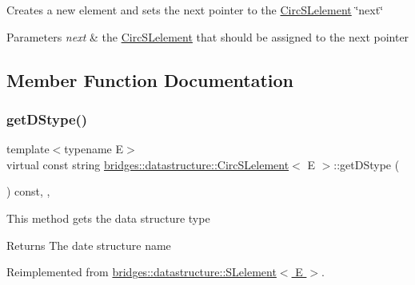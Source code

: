 Creates a new element and sets the next pointer to the \hyperlink{classbridges_1_1datastructure_1_1_circ_s_lelement}{Circ\+S\+Lelement} \char`\"{}next\char`\"{} 
\begin{DoxyParams}{Parameters}
{\em next} & the \hyperlink{classbridges_1_1datastructure_1_1_circ_s_lelement}{Circ\+S\+Lelement} that should be assigned to the next pointer \\
\hline
\end{DoxyParams}


\subsection{Member Function Documentation}
\mbox{\label{classbridges_1_1datastructure_1_1_circ_s_lelement_a775ba08a7811fe91c396cb27ba9343ab}} 
\subsubsection{\texorpdfstring{get\+D\+Stype()}{getDStype()}}
{\footnotesize\ttfamily template$<$typename E$>$ \\
virtual const string \hyperlink{classbridges_1_1datastructure_1_1_circ_s_lelement}{bridges\+::datastructure\+::\+Circ\+S\+Lelement}$<$ E $>$\+::get\+D\+Stype (\begin{DoxyParamCaption}{ }\end{DoxyParamCaption}) const\hspace{0.3cm}{\ttfamily [inline]}, {\ttfamily [override]}, {\ttfamily [virtual]}}

This method gets the data structure type

\begin{DoxyReturn}{Returns}
The date structure name 
\end{DoxyReturn}


Reimplemented from \hyperlink{classbridges_1_1datastructure_1_1_s_lelement_a602156aacacd73d1faa365d68d8af31b}{bridges\+::datastructure\+::\+S\+Lelement$<$ E $>$}.

\mbox{\label{classbridges_1_1datastructure_1_1_circ_s_lelement_aff77056ace1361a35a09dc006eba34a3}} 
